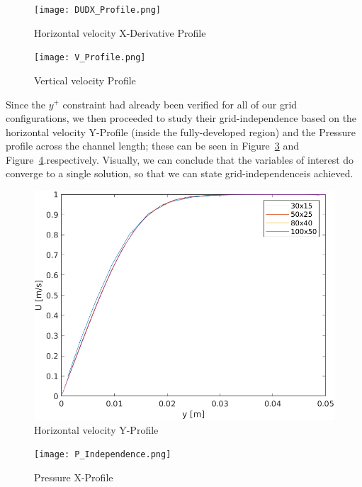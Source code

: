 \documentclass[12pt]{article}
\begin{document}
        \begin{figure}[ht!]
                \centering
                \texttt{[image: DUDX\_Profile.png]}
                \caption{Horizontal velocity X-Derivative Profile}
                \label{fig:DUDX_Profile}
        \end{figure}

        \begin{figure}[ht!]
                \centering
                \texttt{[image: V\_Profile.png]}
                \caption{Vertical velocity Profile}
                \label{fig:V_Profile}
        \end{figure}

        Since the \( y^+ \) constraint had already been verified for all of our grid configurations, we then proceeded to study their grid-independence based on the horizontal velocity Y-Profile (inside the fully-developed region) and the Pressure profile across the channel length; these can be seen in Figure~\ref{fig:U_Ind} and Figure~\ref{fig:P_Ind}.respectively. Visually, we can conclude that the variables of interest do converge to a single solution, so that we can state grid-independenceis achieved.

        \begin{figure}[ht!]
                \centering
                \includegraphics[width=\textwidth]{U_Independence.png}
                \caption{Horizontal velocity Y-Profile}
                \label{fig:U_Ind}
        \end{figure}

        \begin{figure}[ht!]
                \centering
                \texttt{[image: P\_Independence.png]}
                \caption{Pressure X-Profile}
                \label{fig:P_Ind}
        \end{figure}
\end{document}

